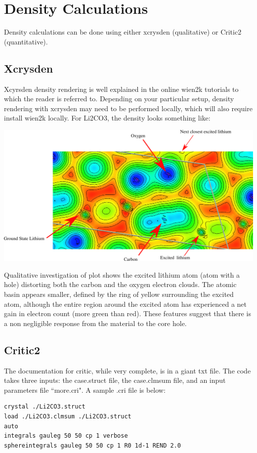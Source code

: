 \documentclass[12pt]{article}
\begin{document}
\section{Density Calculations}
Density calculations can be done using either xcrysden (qualitative) or Critic2 (quantitative).


\subsection{Xcrysden}
Xcyrsden density rendering is well explained in the online wien2k tutorials to which the reader is referred to.  Depending on your particular setup, density rendering with xcrysden may need to be performed locally, which will also require install wien2k locally.  For Li2CO3, the density looks something like: 

\includegraphics[scale=0.3]{./images/density_plot_labeled.png}

Qualitative investigation of plot shows the excited lithium atom (atom with a hole) distorting both the carbon and the oxygen electron clouds. The atomic basin appears smaller, defined by the ring of yellow surrounding the excited atom, although the entire region around the excited atom has experienced a net gain in electron count (more green than red).   These features suggest that there is a non negligible response from the material to the core hole.  

\subsection{Critic2}
The documentation for critic, while very complete, is in a giant txt file. The code takes three inputs: the case.struct file, the case.clmsum file, and an input parameters file ``more.cri".  A sample .cri file is below: 

\begin{lstlisting}
crystal ./Li2CO3.struct
load ./Li2CO3.clmsum ./Li2CO3.struct
auto
integrals gauleg 50 50 cp 1 verbose
sphereintegrals gauleg 50 50 cp 1 R0 1d-1 REND 2.0
\end{lstlisting}
\end{document}
